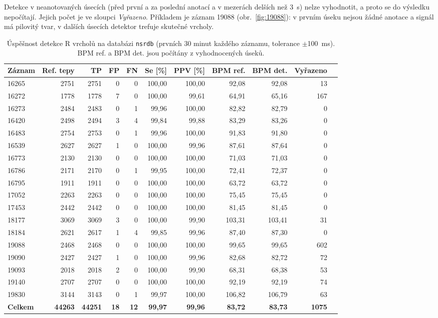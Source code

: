 \documentclass[11pt,a4paper]{article}
\begin{document}
Detekce v neanotovaných úsecích (před první a za poslední anotací a v mezerách delších než
3~s) nelze vyhodnotit, a proto se do výsledku nepočítají. Jejich počet je ve sloupci
\emph{Vyřazeno}. Příkladem je záznam 19088 (obr.~\ref{fig:19088}): v prvním úseku nejsou
žádné anotace a signál má pilovitý tvar, v dalších úsecích detektor trefuje skutečné vrcholy.

\begin{table}[H]
\centering\footnotesize
\setlength{\tabcolsep}{4.5pt}
\caption{Úspěšnost detekce R vrcholů na databázi \texttt{nsrdb} (prvních 30 minut každého záznamu,
tolerance $\pm$100~ms). BPM ref. a BPM det. jsou počítány z vyhodnocených úseků.}
\label{tab:nsrdb}
\begin{tabular}{lrrrrrrrrrr}
\toprule
Záznam & Ref. tepy & TP & FP & FN & Se [\%] & PPV [\%] & BPM ref. & BPM det. & Vyřazeno\\
\midrule
16265 & 2751 & 2751 & 0 & 0 & 100,00 & 100,00 & 92,08 & 92,08 & 13\\
16272 & 1778 & 1778 & 7 & 0 & 100,00 & 99,61 & 64,91 & 65,16 & 167\\
16273 & 2484 & 2483 & 0 & 1 & 99,96 & 100,00 & 82,82 & 82,79 & 0\\
16420 & 2498 & 2494 & 3 & 4 & 99,84 & 99,88 & 83,29 & 83,26 & 0\\
16483 & 2754 & 2753 & 0 & 1 & 99,96 & 100,00 & 91,83 & 91,80 & 0\\
16539 & 2627 & 2627 & 1 & 0 & 100,00 & 99,96 & 87,61 & 87,64 & 0\\
16773 & 2130 & 2130 & 0 & 0 & 100,00 & 100,00 & 71,03 & 71,03 & 0\\
16786 & 2171 & 2170 & 0 & 1 & 99,95 & 100,00 & 72,41 & 72,37 & 0\\
16795 & 1911 & 1911 & 0 & 0 & 100,00 & 100,00 & 63,72 & 63,72 & 0\\
17052 & 2263 & 2263 & 0 & 0 & 100,00 & 100,00 & 75,45 & 75,45 & 0\\
17453 & 2442 & 2442 & 0 & 0 & 100,00 & 100,00 & 81,45 & 81,45 & 0\\
18177 & 3069 & 3069 & 3 & 0 & 100,00 & 99,90 & 103,31 & 103,41 & 31\\
18184 & 2621 & 2617 & 1 & 4 & 99,85 & 99,96 & 87,40 & 87,30 & 0\\
19088 & 2468 & 2468 & 0 & 0 & 100,00 & 100,00 & 99,65 & 99,65 & 602\\
19090 & 2427 & 2427 & 1 & 0 & 100,00 & 99,96 & 82,68 & 82,72 & 72\\
19093 & 2018 & 2018 & 2 & 0 & 100,00 & 99,90 & 68,31 & 68,38 & 53\\
19140 & 2707 & 2707 & 0 & 0 & 100,00 & 100,00 & 92,19 & 92,19 & 74\\
19830 & 3144 & 3143 & 0 & 1 & 99,97 & 100,00 & 106,82 & 106,79 & 63\\
\midrule
\textbf{Celkem} & \textbf{44263} & \textbf{44251} & \textbf{18} & \textbf{12} &
\textbf{99,97} & \textbf{99,96} & \textbf{83,72} & \textbf{83,73} & \textbf{1075}\\
\bottomrule
\end{tabular}
\end{table}
\end{document}
